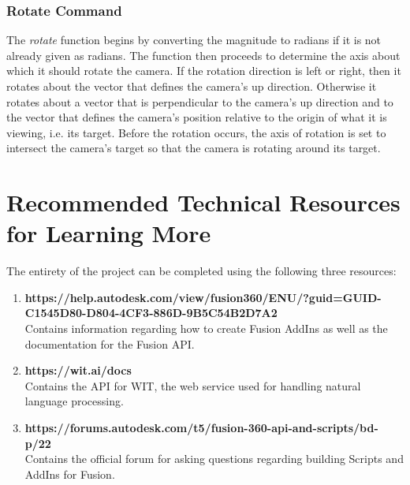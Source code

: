 \documentclass[onecolumn, draftclsnofoot,10pt, compsoc]{IEEEtran}
\begin{document}
\subsubsection{Rotate Command}
The \textit{rotate} function begins by converting the magnitude to radians if it is not already given as radians.
The function then proceeds to determine the axis about which it should rotate the camera.
If the rotation direction is left or right, then it rotates about the vector that defines the camera's up direction.
Otherwise it rotates about a vector that is perpendicular to the camera's up direction and to the vector that defines the camera's position relative to the origin of what it is viewing, i.e. its target.
Before the rotation occurs, the axis of rotation is set to intersect the camera's target so that the camera is rotating around its target.







\section{Recommended Technical Resources for Learning More}
	The entirety of the project can be completed using the following three resources:

	\begin{enumerate}
		\item \textbf{https://help.autodesk.com/view/fusion360/ENU/?guid=GUID-C1545D80-D804-4CF3-886D-9B5C54B2D7A2} \\
			Contains information regarding how to create Fusion AddIns as well as the documentation for the Fusion API.
		\item \textbf{https://wit.ai/docs} \\
			Contains the API for WIT, the web service used for handling natural language processing.
		\item \textbf{https://forums.autodesk.com/t5/fusion-360-api-and-scripts/bd-p/22} \\
			Contains the official forum for asking questions regarding building Scripts and AddIns for Fusion.
	\end{enumerate}
\end{document}
